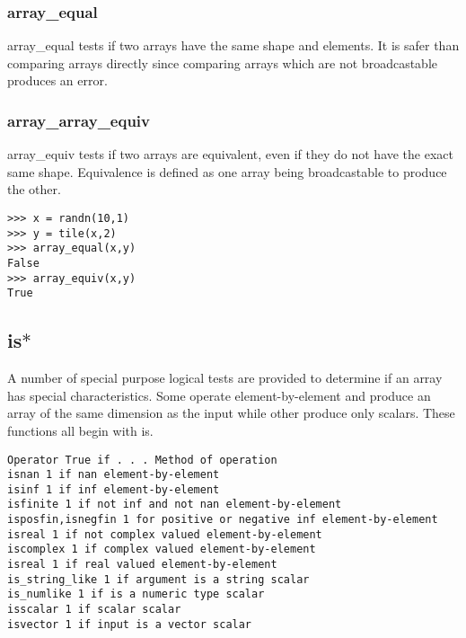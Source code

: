 \documentclass[KSmain.tex]{subfiles}
\begin{document}
\subsubsection{array\_equal}
array_equal tests if two arrays have the same shape and elements. It is safer than comparing arrays directly
since comparing arrays which are not broadcastable produces an error.
\subsubsection{array\_array_equiv}
array_equiv tests if two arrays are equivalent, even if they do not have the exact same shape. Equivalence
is defined as one array being broadcastable to produce the other.
\begin{framed}
\begin{verbatim}>>> x = randn(10,1)
>>> y = tile(x,2)
>>> array_equal(x,y)
False
>>> array_equiv(x,y)
True
\end{verbatim}
\end{framed}

\subsection{ is$\ast$}
A number of special purpose logical tests are provided to determine if an array has special characteristics.
Some operate element-by-element and produce an array of the same dimension as the input while other
produce only scalars. These functions all begin with is.

\begin{verbatim}
Operator True if . . . Method of operation
isnan 1 if nan element-by-element
isinf 1 if inf element-by-element
isfinite 1 if not inf and not nan element-by-element
isposfin,isnegfin 1 for positive or negative inf element-by-element
isreal 1 if not complex valued element-by-element
iscomplex 1 if complex valued element-by-element
isreal 1 if real valued element-by-element
is_string_like 1 if argument is a string scalar
is_numlike 1 if is a numeric type scalar
isscalar 1 if scalar scalar
isvector 1 if input is a vector scalar
\end{verbatim}
\end{document}
